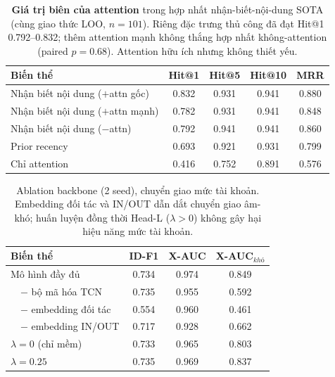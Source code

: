 \documentclass[conference]{IEEEtran}
\begin{document}
\begin{table}[t]\centering\caption{\textbf{Giá trị biên của attention} trong hợp nhất nhận-biết-nội-dung SOTA (cùng giao thức LOO, $n{=}101$). Riêng đặc trưng thủ công đã đạt Hit@1 0.792--0.832; thêm attention mạnh không thắng hợp nhất không-attention (paired $p{=}0.68$). Attention hữu ích nhưng không thiết yếu.}\label{tab:attn}
\begin{tabular}{lcccc}\toprule
\textbf{Biến thể} & \textbf{Hit@1} & \textbf{Hit@5} & \textbf{Hit@10} & \textbf{MRR} \\\midrule
Nhận biết nội dung ($+$attn gốc) & 0.832 & 0.931 & 0.941 & 0.880 \\
Nhận biết nội dung ($+$attn mạnh) & 0.782 & 0.931 & 0.941 & 0.848 \\
Nhận biết nội dung ($-$attn) & 0.792 & 0.941 & 0.941 & 0.860 \\
Prior recency & 0.693 & 0.921 & 0.931 & 0.799 \\
Chỉ attention & 0.416 & 0.752 & 0.891 & 0.576 \\\bottomrule
\end{tabular}\end{table}

\begin{table}[t]\centering\caption{Ablation backbone (2 seed), chuyển giao mức tài
khoản. Embedding đối tác và IN/OUT dẫn dắt chuyển giao âm-khó; huấn luyện đồng thời
Head-L ($\lambda{>}0$) không gây hại hiệu năng mức tài khoản.}\label{tab:abl}
\begin{tabular}{lccc}\toprule
\textbf{Biến thể} & \textbf{ID-F1} & \textbf{X-AUC} & \textbf{X-AUC$_{khó}$} \\\midrule
Mô hình đầy đủ & 0.734 & 0.974 & 0.849 \\
\ \ $-$ bộ mã hóa TCN & 0.735 & 0.955 & 0.592 \\
\ \ $-$ embedding đối tác & 0.554 & 0.960 & 0.461 \\
\ \ $-$ embedding IN/OUT & 0.717 & 0.928 & 0.662 \\
$\lambda{=}0$ (chỉ mềm) & 0.733 & 0.965 & 0.803 \\
$\lambda{=}0.25$ & 0.735 & 0.969 & 0.837 \\
\bottomrule\end{tabular}\end{table}
\end{document}
